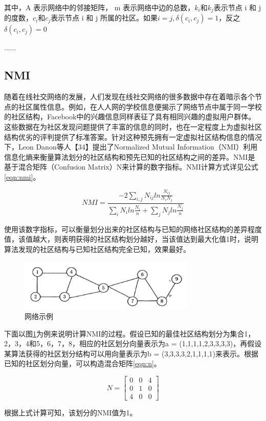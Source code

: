 其中，A 表示网络中的邻接矩阵， m 表示网络中边的总数，$k_i$和$k_j$表示节点 i 和 j 的度数，$c_i$和$c_j$表示节点 i 和 j 所属的社区。如果$i=j,\delta(c_i,c_j)=1$，反之$\delta(c_i,c_j)=0$

......

\subsection{NMI}

随着在线社交网络的发展，人们发现在线社交网络的很多数据中存在着暗示各个节点的社区属性信息。例如，在人人网的学校信息便揭示了网络节点中属于同一学校的社区结构，Facebook中的兴趣信息同样表征了具有相同兴趣的虚拟用户群体。这些数据在为社区发现问题提供了丰富的信息的同时，也在一定程度上为虚拟社区结构优劣的评判提供了标准答案。针对这种预先拥有一定虚拟社区结构信息的情况下，Leon Danon等人【34】提出了Normalized Mutual Information（NMI）利用信息化熵来衡量算法划分的社区结构和预先已知的社区结构之间的差异。NMI是基于混合矩阵（Confusion Matrix）N来计算的数字指标。NMI计算方式详见公式\ref{eqn:nmi}。

\begin{equation}
  \label{eqn:nmi}
  NMI=\frac{ -2 \sum_{i,j} N_{ij}  ln{\frac{N_{ij}}{N_iN_j}} } {\sum_{i}N_iln{\frac{N_i}{n}}+\sum_{j}N_jln{\frac{N_j}{n}}}
\end{equation}

使用该数字指标，可以衡量划分出来的社区结构与已知的网络社区结构的差异程度值，该值越大，则表明获得的社区结构划分越好，当该值达到最大化值1时，说明算法发现的社区结构与已知社区结构完全已知，效果最好。

\begin{figure}
  \centering
  \includegraphics[width=0.75\textwidth]{figures/fig2-2}
  \caption{网络示例}\label{fig:fig2-2}
\end{figure}

下面以图\ref{fig:fig2-2}为例来说明计算NMI的过程。假设已知的最佳社区结构划分为集合{1，2，3，4}和{5，6，7，8}，相应的社区划分向量表示为a = (1,1,1,1,2,3,3,3,3)，再假设某算法获得的社区划分结构可以用向量表示为b = (3,3,3,3,2,1,1,1,1)来表示。根据已知的社区划分向量，可以构造混合矩阵\ref{eqn:n}。

\begin{equation}
  \label{eqn:n}
  N=\begin{bmatrix}
    0 & 0 &4 \\ 
    0 & 1 & 0\\ 
    4 & 0 & 0
    \end{bmatrix}
\end{equation}

根据上式计算可知，该划分的NMI值为1。
